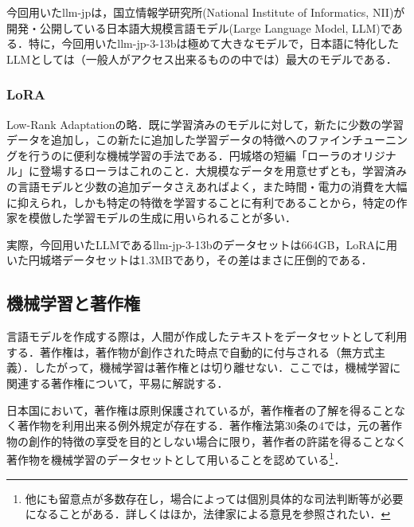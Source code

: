 \documentclass[10pt, a5paper, twoside]{jsarticle}
\theoremstyle{definition}
\begin{document}
				今回用いたllm-jpは，国立情報学研究所(National Institute of Informatics, NII)が開発・公開している日本語大規模言語モデル(Large Language Model, LLM)である．特に，今回用いたllm-jp-3-13bは極めて大きなモデルで，日本語に特化したLLMとしては（一般人がアクセス出来るものの中では）最大のモデルである．
				
			\subsubsection{LoRA}

				Low-Rank Adaptationの略．既に学習済みのモデルに対して，新たに少数の学習データを追加し，この新たに追加した学習データの特徴へのファインチューニングを行うのに便利な機械学習の手法である．円城塔の短編「ローラのオリジナル」に登場するローラはこれのこと．大規模なデータを用意せずとも，学習済みの言語モデルと少数の追加データさえあればよく，また時間・電力の消費を大幅に抑えられ，しかも特定の特徴を学習することに有利であることから，特定の作家を模倣した学習モデルの生成に用いられることが多い．

				実際，今回用いたLLMであるllm-jp-3-13bのデータセットは664GB，LoRAに用いた円城塔データセットは1.3MBであり，その差はまさに圧倒的である．

		\subsection{機械学習と著作権}

			言語モデルを作成する際は，人間が作成したテキストをデータセットとして利用する．著作権は，著作物が創作された時点で自動的に付与される（無方式主義）．したがって，機械学習は著作権とは切り離せない．ここでは，機械学習に関連する著作権について，平易に解説する．

			日本国において，著作権は原則保護されているが，著作権者の了解を得ることなく著作物を利用出来る例外規定が存在する．著作権法第30条の4では，元の著作物の創作的特徴の享受を目的としない場合に限り，著作者の許諾を得ることなく著作物を機械学習のデータセットとして用いることを認めている\footnote{他にも留意点が多数存在し，場合によっては個別具体的な司法判断等が必要になることがある．詳しくは\cite{tx}ほか，法律家による意見を参照されたい．}．
\end{document}
